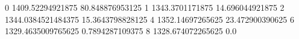 0 1409.52294921875 80.848876953125
1 1343.3701171875 14.696044921875
2 1344.0384521484375 15.3643798828125
4 1352.14697265625 23.472900390625
6 1329.4635009765625 0.7894287109375
8 1328.674072265625 0.0
